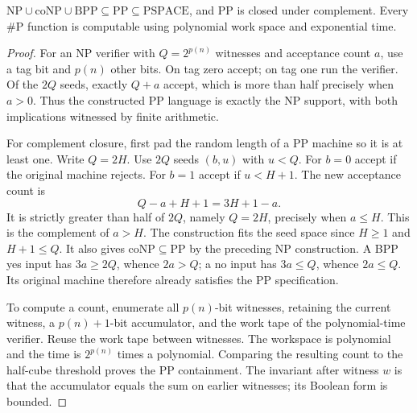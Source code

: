 \begin{theorem}\label{thm:R06}
$\mathrm{NP}\cup\mathrm{coNP}\cup\mathrm{BPP}\subseteq\mathrm{PP}
\subseteq\mathrm{PSPACE}$, and PP is closed under complement. Every
$\#\mathrm P$ function is computable using polynomial work space and
exponential time.
\end{theorem}
\begin{proof}
For an NP verifier with $Q=2^{p(n)}$ witnesses and acceptance count $a$,
use a tag bit and $p(n)$ other bits. On tag zero accept; on tag one run
the verifier. Of the $2Q$ seeds, exactly $Q+a$ accept, which is more than
half precisely when $a>0$. Thus the constructed PP language is exactly
the NP support, with both implications witnessed by finite arithmetic.

For complement closure, first pad the random length of a PP machine so
it is at least one. Write $Q=2H$. Use $2Q$ seeds $(b,u)$ with $u<Q$.
For $b=0$ accept if the original machine rejects. For $b=1$ accept if
$u<H+1$. The new acceptance count is
\[
 Q-a+H+1=3H+1-a.
\]
It is strictly greater than half of $2Q$, namely $Q=2H$, precisely when
$a\leq H$. This is the complement of $a>H$. The construction fits the
seed space since $H\geq1$ and $H+1\leq Q$. It also gives
$\mathrm{coNP}\subseteq\mathrm{PP}$ by the preceding NP construction.
A BPP yes input has $3a\geq2Q$, whence $2a>Q$; a no input has
$3a\leq Q$, whence $2a\leq Q$. Its original machine therefore already
satisfies the PP specification.

To compute a count, enumerate all $p(n)$-bit witnesses, retaining the
current witness, a $p(n)+1$-bit accumulator, and the work tape of the
polynomial-time verifier. Reuse the work tape between witnesses. The
workspace is polynomial and the time is $2^{p(n)}$ times a polynomial.
Comparing the resulting count to the half-cube threshold proves the PP
containment. The invariant after witness $w$ is that the accumulator
equals the sum on earlier witnesses; its Boolean form is bounded.
\end{proof}

